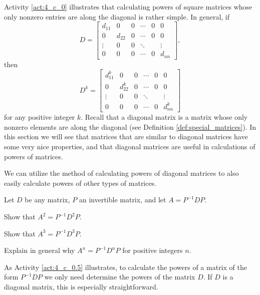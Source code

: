 Activity \ref{act:4_c_0} illustrates that calculating powers of square matrices whose only nonzero entries are along the diagonal is rather simple. In general, if 
\[D = \left[ \begin{array}{cccccc}
d_{11} 	&0 			&0				&\cdots    	&0		&0 \\
0 			& d_{22} 	&0				&\cdots    	&0		&0 \\
 \vdots  & 0      		&0				&\ddots    	&      &\vdots \\
0 			& 0 			&0    			& \cdots		&0  	&d_{nn}
\end{array} \right],\]
then 
\[D^k = \left[ \begin{array}{cccccc}
d_{11}^k 	&0 			&0				&\cdots    	&0		&0 \\
0 			& d_{22}^k 	&0				&\cdots    	&0		&0 \\
 \vdots  & 0      			&0				&\ddots    	&      &\vdots \\
0 			& 0 				&0    			& \cdots		&0  	&d_{nn}^k
\end{array} \right]\]
for any positive integer $k$. Recall that a diagonal matrix is a matrix whose only nonzero elements are along the diagonal (see Definition \ref{def:special_matrices}).  In this section we will see that matrices that are similar to diagonal matrices have some very nice properties, and that diagonal matrices are useful in calculations of powers of matrices. 

We can utilize the method of calculating powers of diagonal matrices to also easily calculate powers of other types of matrices. 

\begin{activity} \label{act:4_c_0.5} Let $D$ be any matrix, $P$ an invertible matrix, and let $A = P^{-1}DP$. 
	\ba
	\item Show that $A^2 = P^{-1}D^2P$.

	\item Show that $A^3 = P^{-1}D^3P$.

	\item Explain in general why $A^n = P^{-1}D^nP$ for positive integers $n$.

	\ea

\end{activity}

As Activity \ref{act:4_c_0.5} illustrates, to calculate the powers of a matrix of the form $P^{-1}DP$ we only need determine the powers of the matrix $D$. If $D$ is a diagonal matrix, this is especially straightforward. 

 


